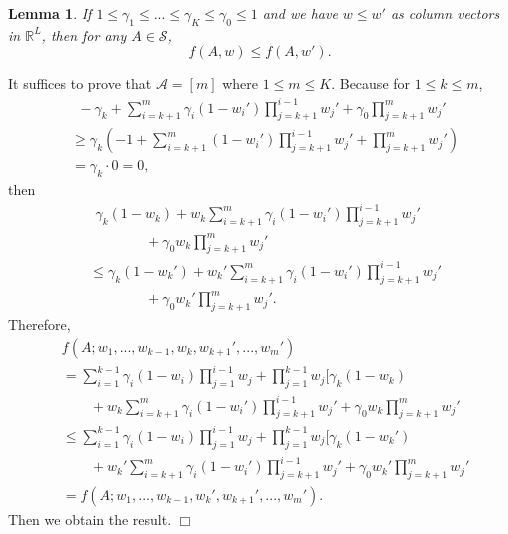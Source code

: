 \documentclass{article}
\newcommand{\RR}{\mathbb{R}}
\newcommand{\cA}{\mathcal{A}}
\newcommand{\cS}{\mathcal{S}}
\newtheorem{lemma}[theorem]{Lemma}%
\newenvironment{proof}{\noindent {\textbf{Proof. }}}{$\Box$ \medskip}
\begin{document}
\begin{lemma}
\label{lem:increasing} 
If $1 \leq \gamma_1 \leq ... \leq \gamma_K \leq \gamma_0 \leq 1$ and we have $w \leq w'$ as column vectors in $\RR^L$, then for any $A\in\cS$,
$$
f(A, w) \leq f(A, w').
$$
\end{lemma}
\begin{proof}
It suffices to prove that $\cA = [m]$ where $1 \leq m \leq K$. Because for $1 \leq k \leq m$,
\begin{align*}
&~~-\gamma_k + \sum_{i=k+1}^m \gamma_i(1- w_i')\prod_{j=k+1}^{i-1}w_j' + \gamma_0\prod_{j=k+1}^{m}w_j'\\
&\geq \gamma_k (-1 + \sum_{i=k+1}^m (1- w_i')\prod_{j=k+1}^{i-1}w_j' +  \prod_{j=k+1}^{m}w_j')\\
&=\gamma_k \cdot 0 = 0,
\end{align*}
then
\begin{align*}
&~~\gamma_k (1 - w_k) + w_k\sum_{i=k+1}^m \gamma_i(1- w_i')\prod_{j=k+1}^{i-1}w_j'\\
&\qquad \qquad + \gamma_0 w_k\prod_{j=k+1}^{m}w_j'\\
& \leq \gamma_k (1 - w_k') + w_k'\sum_{i=k+1}^m \gamma_i(1- w_i')\prod_{j=k+1}^{i-1}w_j'\\
&\qquad \qquad + \gamma_0 w_k'\prod_{j=k+1}^{m}w_j'.
\end{align*}
Therefore, 
\begin{align*}
& f(A; w_1,...,w_{k-1},w_k,w_{k+1}',...,w_m')\\
&=\sum_{i=1}^{k-1} \gamma_i(1 - w_i)\prod_{j=1}^{i-1}w_j + \prod_{j=1}^{k-1}w_j [\gamma_k (1 - w_k) \\
&\qquad + w_k\sum_{i=k+1}^m \gamma_i(1- w_i')\prod_{j=k+1}^{i-1}w_j' + \gamma_0 w_k\prod_{j=k+1}^{m}w_j'\\
&\leq \sum_{i=1}^{k-1} \gamma_i(1 - w_i)\prod_{j=1}^{i-1}w_j + \prod_{j=1}^{k-1}w_j [\gamma_k (1 - w_k') \\
&\qquad + w_k'\sum_{i=k+1}^m \gamma_i(1- w_i')\prod_{j=k+1}^{i-1}w_j' + \gamma_0 w_k'\prod_{j=k+1}^{m}w_j'\\
&=f(A; w_1,...,w_{k-1},w_{k}',w_{k+1}',...,w_m').
\end{align*}
Then we obtain the result.
\end{proof}
	
\end{document}
